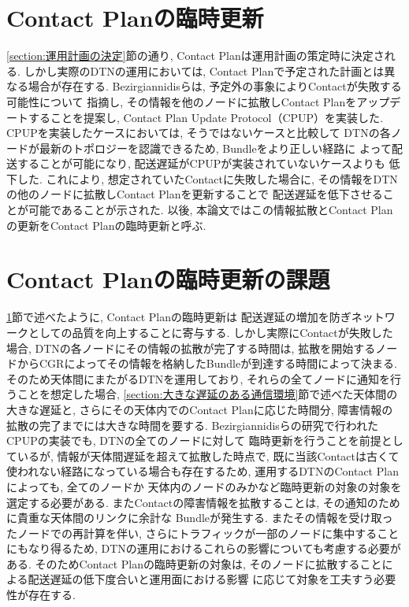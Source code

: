 \section{Contact Planの臨時更新}
\label{section:ContactPlanの臨時更新}
\ref{section:運用計画の決定}節の通り, Contact Planは運用計画の策定時に決定される.  
しかし実際のDTNの運用においては, Contact Planで予定された計画とは異なる場合が存在する.  
Bezirgiannidisらは, 予定外の事象によりContactが失敗する可能性について
指摘し, その情報を他のノードに拡散しContact Planをアップデートすることを提案し, 
Contact Plan Update Protocol（CPUP）を実装した\cite{Bezirgiannidis2013}.  
CPUPを実装したケースにおいては, そうではないケースと比較して
DTNの各ノードが最新のトポロジーを認識できるため, Bundleをより正しい経路に
よって配送することが可能になり, 配送遅延がCPUPが実装されていないケースよりも
低下した. これにより, 想定されていたContactに失敗した場合に, 
その情報をDTNの他のノードに拡散しContact Planを更新することで
配送遅延を低下させることが可能であることが示された. 
以後, 本論文ではこの情報拡散とContact Planの更新をContact Planの臨時更新と呼ぶ. 

\section{Contact Planの臨時更新の課題}
\label{section:ContactPlanの臨時更新の課題}
\ref{section:ContactPlanの臨時更新}節で述べたように, Contact Planの臨時更新は
配送遅延の増加を防ぎネットワークとしての品質を向上することに寄与する. 
しかし実際にContactが失敗した場合, DTNの各ノードにその情報の拡散が完了する時間は, 
拡散を開始するノードからCGRによってその情報を格納したBundleが到達する時間によって決まる.  
そのため天体間にまたがるDTNを運用しており, それらの全てノードに通知を行うことを想定した場合, 
\ref{section:大きな遅延のある通信環境}節で述べた天体間の大きな遅延と, 
さらにその天体内でのContact Planに応じた時間分, 障害情報の拡散の完了までには大きな時間を要する.  
Bezirgiannidisらの研究で行われたCPUPの実装でも, DTNの全てのノードに対して
臨時更新を行うことを前提としているが, 情報が天体間遅延を超えて拡散した時点で, 
既に当該Contactは古くて使われない経路になっている場合も存在するため, 
運用するDTNのContact Planによっても, 全てのノードか
天体内のノードのみかなど臨時更新の対象の対象を選定する必要がある.  
またContactの障害情報を拡散することは, その通知のために貴重な天体間のリンクに余計な
Bundleが発生する. またその情報を受け取ったノードでの再計算を伴い, 
さらにトラフィックが一部のノードに集中することにもなり得るため, 
DTNの運用におけるこれらの影響についても考慮する必要がある.  
そのためContact Planの臨時更新の対象は, そのノードに拡散することによる配送遅延の低下度合いと運用面における影響
に応じて対象を工夫すう必要性が存在する.  
